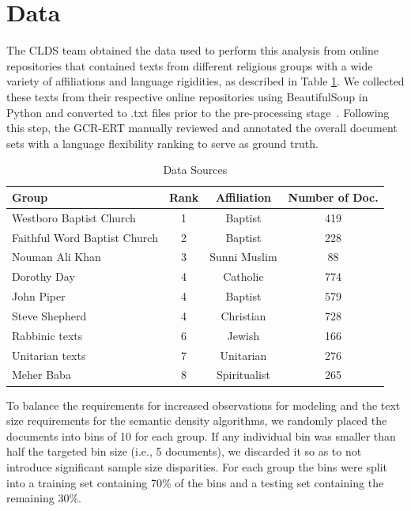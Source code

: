 \documentclass[11pt]{article}
\begin{document}
\section{Data}\label{data}

The CLDS team obtained the data used to perform this analysis from online repositories that contained texts from different religious groups with a wide variety of affiliations and language rigidities, as described in Table \ref{table:data}. We collected these texts from their respective online repositories using BeautifulSoup in Python and converted to .txt files prior to the pre-processing stage~\cite{Richardson2015}. Following this step, the GCR-ERT manually reviewed and annotated the overall document sets with a language flexibility ranking to serve as ground truth.

\begin{table}[ht]
\caption{Data Sources}
\begin{center}
\begin{tabular}{lccc}
 \\  \hline
Group & Rank & Affiliation & Number of Doc.  \\ \hline
Westboro Baptist Church 		& 1 & Baptist		& 419 \\
Faithful Word Baptist Church	& 2 & Baptist		& 228 \\
Nouman Ali Khan			& 3 & Sunni Muslim	& 88 \\
Dorothy Day				& 4 & Catholic		& 774 \\
John Piper				& 4 & Baptist		& 579 \\
Steve Shepherd			& 4 & Christian		& 728 \\
Rabbinic texts				& 6 & Jewish		& 166 \\
Unitarian texts				& 7 & Unitarian		& 276 \\ 
Meher Baba				& 8 & Spiritualist	& 265 \\	

\end{tabular}
\end{center}
\label{table:data}
\end{table}

To balance the requirements for increased observations for modeling and the text size requirements for the semantic density algorithms, we randomly placed the documents into bins of 10 for each group. If any individual bin was smaller than half the targeted bin size (i.e., 5 documents), we discarded it so as to not introduce significant sample size disparities. For each group the bins were split into a training set containing 70\% of the bins and a testing set containing the remaining 30\%. 
\end{document}
